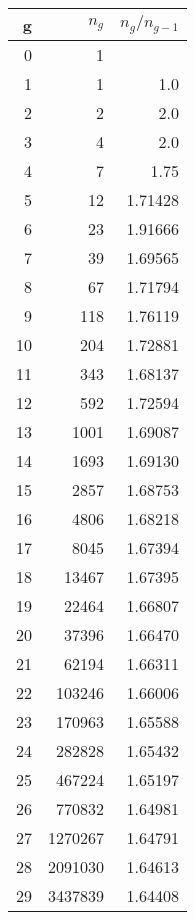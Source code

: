 \documentclass[reqno,11pt]{amsart}
\theoremstyle{plain}
\theoremstyle{definition}
\begin{document}
\begin{minipage}{0.5\textwidth}
\begin{tabular}{|r|r|r|}
\hline
g & $n_g$ & $n_g/n_{g-1}$\\
\hline
0 & 1 &  \\
1 & 1 & 1.0 \\
2 & 2 & 2.0 \\
3 & 4 & 2.0 \\
4 & 7 & 1.75 \\
5 & 12 & 1.71428 \\
6 & 23 & 1.91666 \\
7 & 39 & 1.69565 \\
8 & 67 & 1.71794 \\
9 & 118 & 1.76119 \\
10 & 204 & 1.72881 \\
11 & 343 & 1.68137 \\
12 & 592 & 1.72594 \\
13 & 1001 & 1.69087 \\
14 & 1693 & 1.69130 \\
15 & 2857 & 1.68753 \\
16 & 4806 & 1.68218 \\
17 & 8045 & 1.67394 \\
18 & 13467 & 1.67395 \\
19 & 22464 & 1.66807 \\
20 & 37396 & 1.66470 \\
21 & 62194 & 1.66311 \\
22 & 103246 & 1.66006 \\
23 & 170963 & 1.65588 \\
24 & 282828 & 1.65432 \\
25 & 467224 & 1.65197 \\
26 & 770832 & 1.64981 \\
27 & 1270267 & 1.64791 \\
28 & 2091030 & 1.64613 \\
29 & 3437839 & 1.64408 \\
\hline
\end{tabular}
\end{minipage}
\end{document}
